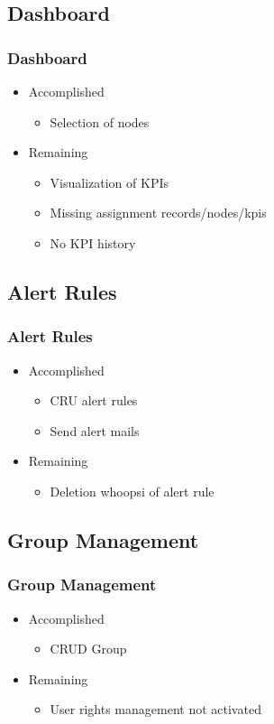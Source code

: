 \documentclass[aspectratio=1610,20pt,utf8]{beamer}
\begin{document}
\subsection{Dashboard}
\begin{frame}
\frametitle{Dashboard}
\begin{itemize}
	\item Accomplished
	\begin{itemize}
		\item Selection of nodes
	\end{itemize}
	\item Remaining
	\begin{itemize}
		\item Visualization of KPIs
		\item Missing assignment records/nodes/kpis
		\item No KPI history
	\end{itemize}
\end{itemize}

\end{frame}


\subsection{Alert Rules}
\begin{frame}
\frametitle{Alert Rules}
\begin{itemize}
	\item Accomplished
	\begin{itemize}
		\item CRU alert rules
		\item Send alert mails
	\end{itemize}
	\item Remaining
	\begin{itemize}
		\item Deletion whoopsi of alert rule
	\end{itemize}
\end{itemize}

\end{frame}


\subsection{Group Management}
\begin{frame}
\frametitle{Group Management}
\begin{itemize}
	\item Accomplished
	\begin{itemize}
		\item CRUD Group
	\end{itemize}
	\item Remaining
	\begin{itemize}
		\item User rights management not activated
	\end{itemize}
\end{itemize}
\end{frame}
\end{document}
